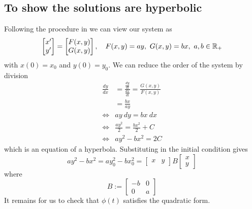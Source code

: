 \documentclass[12pt]{article}
\begin{document}
\subsection{To show the solutions are hyperbolic}
Following the procedure in \cite[Chap. 9~]{boyce2013elementary} we can view our system as 
\begin{equation}
  \begin{bmatrix}
    x^\prime\\
  y^\prime	
  \end{bmatrix}=\begin{bmatrix}
  F(x,y)\\
  G(x,y)
\end{bmatrix},\quad F(x,y)=ay,~G(x,y)=bx,~ a,b\in\mathbb{R}_+
\end{equation}
with $x(0)=x_0$ and $y(0)=y_0$. We can reduce the order of the system by division
\begin{align*}
  \frac{dy}{dx}&=\frac{\frac{dy}{dt}}{\frac{dx}{dt}} = \frac{G(x,y)}{F(x,y)}\\
						    &=\frac{bx}{ay}\\
  \iff& ay~dy = bx~dx\\
  \iff& \frac{ay^2}{2} = \frac{bx^2}{2}+C\\
  \iff& ay^2-bx^2 = 2C
\end{align*}
which is an equation of a hyperbola. Substituting in the initial condition gives 
\begin{equation*}
  ay^2-bx^2 = ay_0^2-bx_0^2 = \begin{bmatrix} x & y\end{bmatrix}B\begin{bmatrix} x \\ y\end{bmatrix}
\end{equation*}
where 
\[
  B :=\begin{bmatrix}-b & 0\\
  0 & a\end{bmatrix}
\]
It remains for us to check that $\phi(t)$ satisfies the quadratic form.
\end{document}
